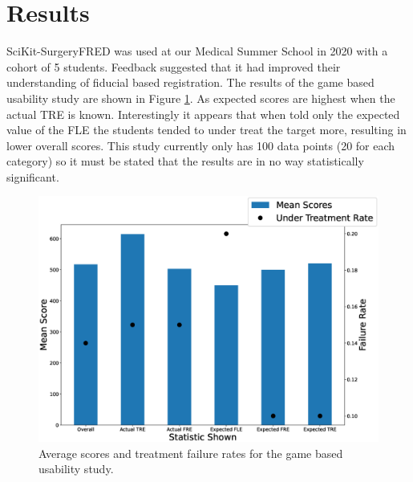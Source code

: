 \section{Results}
SciKit-SurgeryFRED was used at our Medical Summer School in 2020 with a cohort of 5 students. Feedback suggested that it had improved their understanding
of fiducial based registration. The results of the game based usability study are shown in Figure \ref{fig:usability}. As expected scores are 
highest when the actual \gls{TRE} is known. Interestingly it appears that when told only the expected value of the \gls{FLE} the students
tended to under treat the target more, resulting in lower overall scores. This study currently only has 100 data points (20 for each category)
so it must be stated that the results are in no way statistically significant. 

\begin{figure}
        \begin{center}
        \includegraphics[width=0.7\linewidth]{usability.eps}
                \caption{\label{fig:usability}Average scores and treatment failure rates for the game based usability study.}
	\end{center}
\end{figure}


